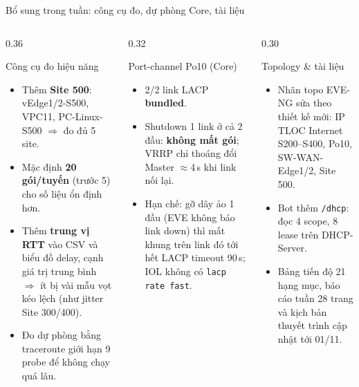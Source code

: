 \documentclass[aspectratio=169, 10pt, xcolor={table}]{beamer}
\begin{document}
\begin{frame}{Bổ sung trong tuần: công cụ đo, dự phòng Core, tài liệu}
    \begin{columns}[T]
        \begin{column}{0.36\textwidth}
            \begin{card}{Công cụ đo hiệu năng}
                \scriptsize
                \begin{itemize}\setlength{\itemsep}{2pt}
                    \item Thêm \textbf{Site 500}: vEdge1/2-S500, VPC11, PC-Linux-S500 $\Rightarrow$ đo đủ 5 site.
                    \item Mặc định \textbf{20 gói/tuyến} (trước 5) cho số liệu ổn định hơn.
                    \item Thêm \textbf{trung vị RTT} vào CSV và biểu đồ delay, cạnh giá trị trung bình $\Rightarrow$ ít bị vài mẫu vọt kéo lệch (như jitter Site 300/400).
                    \item Đo dự phòng bằng traceroute giới hạn 9 probe để không chạy quá lâu.
                \end{itemize}
            \end{card}
        \end{column}
        \begin{column}{0.32\textwidth}
            \begin{card}[accent]{Port-channel Po10 (Core)}
                \scriptsize
                \begin{itemize}\setlength{\itemsep}{2pt}
                    \item 2/2 link LACP \textbf{bundled}.
                    \item Shutdown 1 link ở cả 2 đầu: \textbf{không mất gói}; VRRP chỉ thoáng đổi Master $\approx$4\,s khi link nối lại.
                    \item Hạn chế: gỡ dây ảo 1 đầu (EVE không báo link down) thì mất khung trên link đó tới hết LACP timeout 90\,s; IOL không có \texttt{lacp rate fast}.
                \end{itemize}
            \end{card}
        \end{column}
        \begin{column}{0.30\textwidth}
            \begin{card}[okGreen]{Topology \& tài liệu}
                \scriptsize
                \begin{itemize}\setlength{\itemsep}{2pt}
                    \item Nhãn topo EVE-NG sửa theo thiết kế mới: IP TLOC Internet S200--S400, Po10, SW-WAN-Edge1/2, Site 500.
                    \item Bot thêm \texttt{/dhcp}: đọc 4 scope, 8 lease trên DHCP-Server.
                    \item Bảng tiến độ 21 hạng mục, báo cáo tuần 28 trang và kịch bản thuyết trình cập nhật tới 01/11.
                \end{itemize}
            \end{card}
        \end{column}
    \end{columns}
\end{frame}
\end{document}

